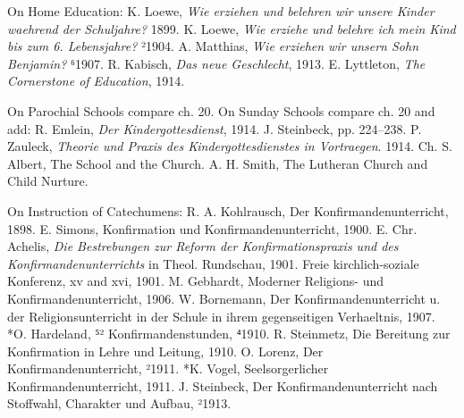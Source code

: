 On Home Education: K. Loewe, \emph{Wie erziehen und belehren wir unsere Kinder waehrend der Schuljahre?} 1899. K. Loewe, \emph{Wie erziehe und belehre ich mein Kind bis zum 6. Lebensjahre?} ²1904. A. Matthias, \emph{Wie erziehen wir unsern Sohn Benjamin?} ⁶1907. R. Kabisch, \emph{Das neue Geschlecht}, 1913. E. Lyttleton, \emph{The Cornerstone of Education}, 1914.

On Parochial Schools compare ch. 20. On Sunday Schools compare ch. 20 and add: R. Emlein, \emph{Der Kindergottesdienst}, 1914. J. Steinbeck, pp. 224–238. P. Zauleck, \emph{Theorie und Praxis des Kindergottesdienstes in Vortraegen}. 1914. Ch. S. Albert, The School and the Church. A. H. Smith, The Lutheran Church and Child Nurture.

On Instruction of Catechumens: R. A. Kohlrausch, Der Konfirmandenunterricht, 1898. E. Simons, Konfirmation und Konfirmandenunterricht, 1900. E. Chr. Achelis, \emph{Die Bestrebungen zur Reform der Konfirmationspraxis und des Konfirmandenunterrichts} in Theol. Rundschau, 1901. Freie kirchlich-soziale Konferenz, xv and xvi, 1901. M. Gebhardt, Moderner Religions- und Konfirmandenunterricht, 1906. W. Bornemann, Der Konfirmandenunterricht u. der Religionsunterricht in der Schule in ihrem gegenseitigen Verhaeltnis, 1907. *O. Hardeland, ⁵² Konfirmandenstunden, ⁴1910. R. Steinmetz, Die Bereitung zur Konfirmation in Lehre und Leitung, 1910. O. Lorenz, Der Konfirmandenunterricht, ²1911. *K. Vogel, Seelsorgerlicher Konfirmandenunterricht, 1911. J. Steinbeck, Der Konfirmandenunterricht nach Stoffwahl, Charakter und Aufbau, ²1913.

